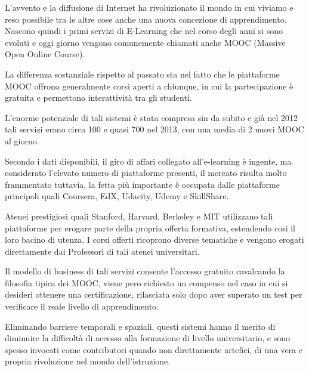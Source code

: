 L'avvento e la diffusione di Internet ha rivoluzionato il mondo in cui viviamo e reso possibile tra le altre cose anche una nuova concezione di apprendimento. Nascono quindi i primi servizi di E-Learning che nel corso degli anni si sono evoluti e oggi giorno vengono comunemente chiamati anche MOOC (Massive Open Online Course).

La differenza sostanziale rispetto al passato sta nel fatto che le piattaforme MOOC offrono generalmente corsi aperti a chiunque, in cui la partecipazione è gratuita e permettono interattività tra gli studenti.

L'enorme potenziale di tali sistemi è stata compresa sin da subito e già nel 2012 tali servizi erano circa 100 e quasi 700 nel 2013, con una media di 2 nuovi MOOC al giorno.



Secondo i dati disponibili, il giro di affari collegato all'e-learning è ingente, ma considerato l'elevato numero di piattaforme presenti, il mercato risulta molto frammentato tuttavia, la fetta più importante è occupata dalle piattaforme principali quali Coursera, EdX, Udacity, Udemy e SkillShare.


Atenei prestigiosi quali Stanford, Harvard, Berkeley e MIT utilizzano tali piattaforme per erogare parte della propria offerta formativa, estendendo cosi il loro bacino di utenza.
I corsi offerti ricoprono diverse tematiche e vengono erogati direttamente dai Professori di tali atenei universitari.

Il modello di business di tali servizi consente l'accesso gratuito cavalcando la filosofia tipica dei MOOC, viene pero richiesto un compenso nel caso in cui si desideri ottenere una certificazione, rilasciata solo dopo aver superato un test per verificare il reale livello di apprendimento.

Eliminando barriere temporali e spaziali, questi sistemi hanno il merito di diminuire la difficoltà di accesso alla formazione di livello universitario, e sono spesso invocati come contributori quando non direttamente artefici, di una vera e propria rivoluzione nel mondo dell'istruzione.

